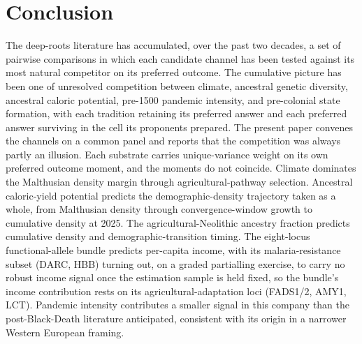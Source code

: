 \documentclass[11pt,letterpaper]{article}
\begin{document}
\section{Conclusion}
\label{sec:conclusion}

The deep-roots literature has accumulated, over the past two decades, a set of pairwise comparisons in which each candidate channel has been tested against its most natural competitor on its preferred outcome. The cumulative picture has been one of unresolved competition between climate, ancestral genetic diversity, ancestral caloric potential, pre-1500 pandemic intensity, and pre-colonial state formation, with each tradition retaining its preferred answer and each preferred answer surviving in the cell its proponents prepared. The present paper convenes the channels on a common panel and reports that the competition was always partly an illusion. Each substrate carries unique-variance weight on its own preferred outcome moment, and the moments do not coincide. Climate dominates the Malthusian density margin through agricultural-pathway selection. Ancestral caloric-yield potential predicts the demographic-density trajectory taken as a whole, from Malthusian density through convergence-window growth to cumulative density at 2025. The agricultural-Neolithic ancestry fraction predicts cumulative density and demographic-transition timing. The eight-locus functional-allele bundle predicts per-capita income, with its malaria-resistance subset (DARC, HBB) turning out, on a graded partialling exercise, to carry no robust income signal once the estimation sample is held fixed, so the bundle's income contribution rests on its agricultural-adaptation loci (FADS1/2, AMY1, LCT). Pandemic intensity contributes a smaller signal in this company than the post-Black-Death literature anticipated, consistent with its origin in a narrower Western European framing.
\end{document}
